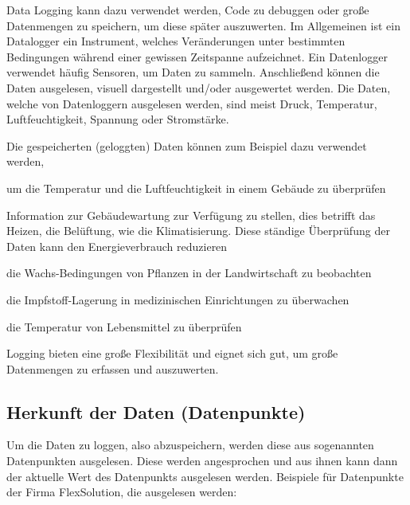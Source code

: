 
Data Logging kann dazu verwendet werden, Code zu debuggen oder große Datenmengen zu speichern, um diese später auszuwerten. Im Allgemeinen ist ein Datalogger ein Instrument, welches Veränderungen unter bestimmten Bedingungen während einer gewissen Zeitspanne aufzeichnet. Ein Datenlogger verwendet häufig Sensoren, um Daten zu sammeln. Anschließend können die Daten ausgelesen, visuell dargestellt und/oder ausgewertet werden. Die Daten, welche von Datenloggern ausgelesen werden, sind meist Druck, Temperatur, Luftfeuchtigkeit, Spannung oder Stromstärke. \cite{DataLogging} 

Die gespeicherten (geloggten) Daten können zum Beispiel dazu verwendet werden, 

\begin{compactitem}
    \item um die Temperatur und die Luftfeuchtigkeit in einem Gebäude zu überprüfen
    \item Information zur Gebäudewartung zur Verfügung zu stellen, dies betrifft das Heizen, die Belüftung, wie die Klimatisierung. Diese ständige Überprüfung der Daten kann den Energieverbrauch reduzieren
    \item die Wachs-Bedingungen von Pflanzen in der Landwirtschaft zu beobachten
    \item die Impfstoff-Lagerung in medizinischen Einrichtungen zu überwachen
    \item die Temperatur von Lebensmittel zu überprüfen
\end{compactitem}
\cite{DataLogging}

Logging bieten eine große Flexibilität und eignet sich gut, um große Datenmengen zu erfassen und auszuwerten. \cite{BigDataBuch}

\subsection{Herkunft der Daten (Datenpunkte)}
Um die Daten zu loggen, also abzuspeichern, werden diese aus sogenannten Datenpunkten ausgelesen. Diese werden angesprochen und aus ihnen kann dann der aktuelle Wert des Datenpunkts ausgelesen werden.
Beispiele für Datenpunkte der Firma FlexSolution, die ausgelesen werden: 

